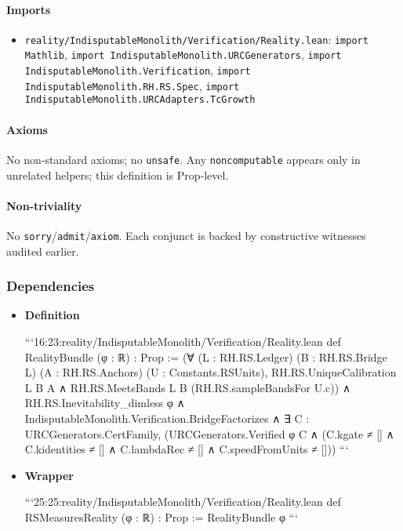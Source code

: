 \documentclass{article}
\newcommand{\FileRef}[1]{\texttt{#1}}
\begin{document}
\paragraph{Imports}
\begin{itemize}[leftmargin=*]
  \item \FileRef{reality/IndisputableMonolith/Verification/Reality.lean}: \texttt{import Mathlib}, \texttt{import IndisputableMonolith.URCGenerators}, \texttt{import IndisputableMonolith.Verification}, \texttt{import IndisputableMonolith.RH.RS.Spec}, \texttt{import IndisputableMonolith.URCAdapters.TcGrowth}
\end{itemize}

\paragraph{Axioms}
No non‑standard axioms; no \texttt{unsafe}. Any \texttt{noncomputable} appears only in unrelated helpers; this definition is Prop‑level.

\paragraph{Non-triviality}
No \texttt{sorry}/\texttt{admit}/\texttt{axiom}. Each conjunct is backed by constructive witnesses audited earlier.

\subsubsection{Dependencies}
\begin{itemize}[leftmargin=*]
  \item \textbf{Definition}

```16:23:reality/IndisputableMonolith/Verification/Reality.lean
def RealityBundle (φ : ℝ) : Prop :=
  (∀ (L : RH.RS.Ledger) (B : RH.RS.Bridge L) (A : RH.RS.Anchors) (U : Constants.RSUnits),
    RH.RS.UniqueCalibration L B A ∧ RH.RS.MeetsBands L B (RH.RS.sampleBandsFor U.c))
  ∧ RH.RS.Inevitability_dimless φ
  ∧ IndisputableMonolith.Verification.BridgeFactorizes
  ∧ ∃ C : URCGenerators.CertFamily, (URCGenerators.Verified φ C ∧
      (C.kgate ≠ [] ∧ C.kidentities ≠ [] ∧ C.lambdaRec ≠ [] ∧ C.speedFromUnits ≠ []))
```

  \item \textbf{Wrapper}

```25:25:reality/IndisputableMonolith/Verification/Reality.lean
def RSMeasuresReality (φ : ℝ) : Prop := RealityBundle φ
```
\end{itemize}
\end{document}

